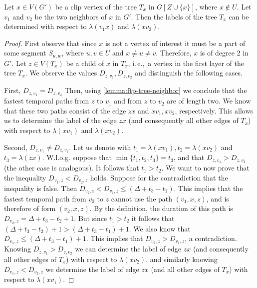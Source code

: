 \documentclass[a4paper,UKenglish,cleveref, autoref, thm-restate]{lipics-v2021}
\newcommand{\ie}{i.\,e.,\ }
\begin{document}
\begin{lemma} \label{lemma:treeLabels-notInteresting}
    Let $x \in V(G')$ be a clip vertex of the tree $T_x$ in $G[Z \cup \{x\}]$, where $x \notin U$. 
    Let $v_1$ and $v_2$ be the two neighbors of $x$ in $G'$.
    Then the labels of the tree $T_x$ can be determined with respect to $\lambda(v_1 x)$ and $\lambda(x v_2)$.
\end{lemma}
%
\begin{proof}
    First observe that since $x$ is not a vertex of interest it must be a part of some segment $S_{u,w}$, where $u,v \in U$ and $x \neq u \neq v$. Therefore, $x$ is of degree $2$ in $G'$.
    Let $z \in V(T_x)$ be a child of $x$ in $T_x$, \ie a vertex in the first layer of the tree $T_x$.
    We observe the values $D_{z,v_1}, D_{z,v_2}$ and distinguish the following cases.

    First, $D_{z,v_1} = D_{z,v_2}$
    Then, using \cref{lemma:ftp-tree-neighbor} we conclude that the fastest temporal paths from $z$ to $v_1$ and from $z$ to $v_2$ are of length two.
    We know that these two paths consist of the edge $zx$ and $xv_1,xv_2$, respectively.
    This allows us to determine the label of the edge $zx$ (and consequently all other edges of $T_x$) with respect to $\lambda(xv_1)$ and $\lambda(xv_2)$.

    Second, $D_{z,v_1} \neq D_{z,v_2}$. 
    Let us denote with $t_1 = \lambda(x v_1), t_2 = \lambda(x v_2)$ and $t_3 = \lambda(zx)$.
    W.l.o.g. suppose that $\min \{t_1,t_2,t_3\} = t_3$, and that $D_{z,v_1} > D_{z,v_2}$ (the other case is analogous). It follows that $t_1 > t_2$.
    We want to now prove that the inequality $D_{v_1,z} < D_{v_2,z}$ holds.
    Suppose for the contradiction that the inequality is false. Then $D_{v_2,z} < D_{v_1,z} \leq (\Delta + t_3 - t_1)$. This implies that the fastest temporal path from $v_2$ to $z$ cannot use the path $(v_1,x,z)$, and is therefore of form $(v_2,x,z)$.
    By the definition, the duration of this path is $D_{v_2,z} = \Delta + t_3 - t_2 + 1$.
    But since $t_1 > t_2$ it follows that $(\Delta + t_3 - t_2) + 1 > (\Delta + t_3 - t_1) + 1$.  We also know that $D_{v_1,z} \leq  (\Delta + t_3 - t_1) + 1$. 
    This implies that $D_{v_2,z} > D_{v_1,z} $, a contradiction.\\
    Knowing $D_{z,v_1} > D_{z,v_2}$ we can determine the label of edge $zx$ (and consequently all other edges of $T_x$) with respect to $\lambda(x v_2)$,
    and similarly knowing $D_{v_1,z} < D_{v_2,z}$ we determine the label of edge $zx$ (and all other edges of $T_x$) with respect to $\lambda(x v_1)$.
\end{proof}
\end{document}
